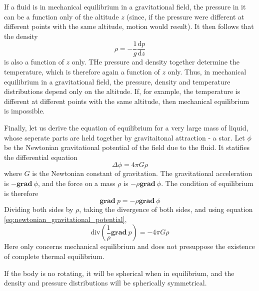 \documentclass[conference]{IEEEtran}
\theoremstyle{definition}
\theoremstyle{remark}
\begin{document}
    If a fluid is in mechanical equilibrium in a gravitational field, the pressure in it can be a function only of the altitude $z$ (since, if the pressure were different at different points with the same altitude, motion would result). It then follows that the density
    \begin{equation}
        \rho = -\dfrac1{g} \dfrac{\mathrm{d} p}{\mathrm{d} z}
    \end{equation}
    is also a function of $z$ only. THe pressure and density together determine the temperature, which is therefore again a function of $z$ only. Thus, in mechanical equilibrium in a gravitational field, the pressure, density and temperature distributions depend only on the altitude. If, for example, the temperature is different at different points with the same altitude, then mechanical equilibrium is impossible.

    Finally, let us derive the equation of equilibrium for a very large mass of liquid, whose seperate parts are held together by gravitaitonal attraction - a star. Let $\phi$ be the Newtonian gravitational potential of the field due to the fluid. It statifies the differential equation
    \begin{equation}
        \Delta \phi = 4 \pi G \rho
        \label{eq:newtonian_gravitational_potential}
    \end{equation}
    where $G$ is the Newtonian constant of gravitation. The gravitational acceleration is $-\textbf{grad} \ \phi$, and the force on a mass $\rho$ is $-\rho \textbf{grad} \ \phi$. The condition of equilibrium is therefore
    \[
        \textbf{grad} \ p = - \rho \textbf{grad} \ \phi
    \]
    Dividing both sides by $\rho$, taking the divergence of both sides, and using equation \ref{eq:newtonian_gravitational_potential},
    \begin{equation}
        \text{div} \left( \dfrac1\rho \textbf{grad} \ p \right) = -4\pi G\rho
    \end{equation}
    Here only concerns mechanical equilibrium and does not presuppose the existence of complete thermal equilibrium.

    If the body is no rotating, it will be spherical when in equilibrium, and the density and pressure distributions will be spherically symmetrical. 
\end{document}
